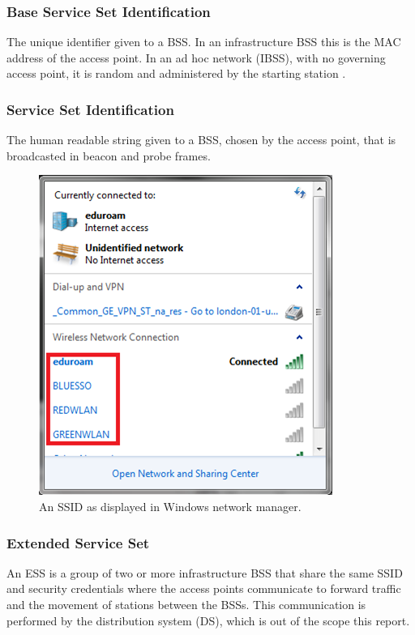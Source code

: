\subsubsection*{Base Service Set Identification}
The unique identifier given to a BSS. In an infrastructure BSS this is the MAC address of the access point. In an ad hoc network (IBSS), with no governing access point, it is random and administered by the starting station \cite{intro:ieee_tutorial}.

\subsubsection*{Service Set Identification}
The human readable  string given to a BSS, chosen by the access point, that is broadcasted in beacon and probe frames.

\begin{figure}[htb!]
\centering\includegraphics{intro/diagrams/ssid.png}
\caption{An SSID as displayed in Windows network manager.}
\end{figure}

\subsubsection*{Extended Service Set}
An ESS is a group of two or more infrastructure BSS that share the same SSID and security credentials where the access points communicate to forward traffic and the movement of stations between the BSSs. This communication is performed by the distribution system (DS), which is out of the scope this report.

